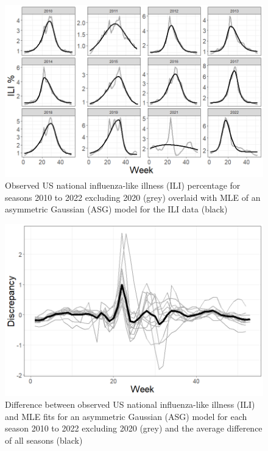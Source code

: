 \documentclass[ba]{imsart}
\theoremstyle{plain}
\theoremstyle{definition}
\theoremstyle{remark}
\begin{document}
\begin{figure}
    \centering
    \includegraphics[scale=.5]{Images/asg_fits.png}
    \caption{Observed US national influenza-like illness (ILI) percentage for seasons 2010 to 2022 excluding 2020 (grey) overlaid with MLE of an asymmetric Gaussian (ASG) model for the ILI data (black)}
    \label{fig:asg_fits}
\end{figure}

\begin{figure}
    \centering
    \includegraphics[scale=.45]{Images/discrepancy.png}
    \caption{Difference between observed US national influenza-like illness (ILI) and MLE fits for an asymmetric Gaussian (ASG) model for each season 2010 to 2022 excluding 2020 (grey) and the average difference of all seasons (black)}
    \label{fig:discrepancy}
\end{figure}
\end{document}
